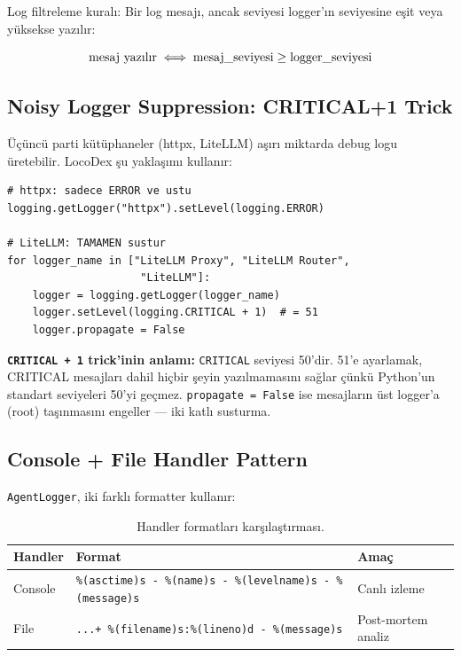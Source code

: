 Log filtreleme kural{\i}: Bir log mesaj{\i}, ancak seviyesi logger'{\i}n seviyesine e\c{s}it veya y\"{u}ksekse yaz{\i}l{\i}r:

\begin{equation}
\text{mesaj yaz{\i}l{\i}r} \iff \text{mesaj\_seviyesi} \geq \text{logger\_seviyesi}
\end{equation}

\subsection{Noisy Logger Suppression: CRITICAL+1 Trick}
\label{subsec:noisy-logger}

\"{U}\c{c}\"{u}nc\"{u} parti k\"{u}t\"{u}phaneler (httpx, LiteLLM) a\c{s}{\i}r{\i} miktarda debug logu \"{u}retebilir. LocoDex \c{s}u yakla\c{s}{\i}m{\i} kullan{\i}r:

\begin{verbatim}
# httpx: sadece ERROR ve ustu
logging.getLogger("httpx").setLevel(logging.ERROR)

# LiteLLM: TAMAMEN sustur
for logger_name in ["LiteLLM Proxy", "LiteLLM Router",
                     "LiteLLM"]:
    logger = logging.getLogger(logger_name)
    logger.setLevel(logging.CRITICAL + 1)  # = 51
    logger.propagate = False
\end{verbatim}

\textbf{\texttt{CRITICAL + 1} trick'inin anlam{\i}:} \texttt{CRITICAL} seviyesi 50'dir. 51'e ayarlamak, CRITICAL mesajlar{\i} dahil hi\c{c}bir \c{s}eyin yaz{\i}lmamas{\i}n{\i} sa\u{g}lar \c{c}\"{u}nk\"{u} Python'un standart seviyeleri 50'yi ge\c{c}mez. \texttt{propagate = False} ise mesajlar{\i}n \"{u}st logger'a (root) ta\c{s}{\i}nmas{\i}n{\i} engeller --- iki katl{\i} susturma.

\subsection{Console + File Handler Pattern}

\texttt{AgentLogger}, iki farkl{\i} formatter kullan{\i}r:

\begin{table}[H]
\centering
\caption{Handler formatlar{\i} kar\c{s}{\i}la\c{s}t{\i}rmas{\i}.}
\label{tab:handler-formats}
\begin{tabular}{lll}
\toprule
\textbf{Handler} & \textbf{Format} & \textbf{Ama\c{c}} \\
\midrule
Console & \texttt{\%(asctime)s - \%(name)s - \%(levelname)s - \%(message)s} & Canl{\i} izleme \\
File & \texttt{...+ \%(filename)s:\%(lineno)d - \%(message)s} & Post-mortem analiz \\
\bottomrule
\end{tabular}
\end{table}

